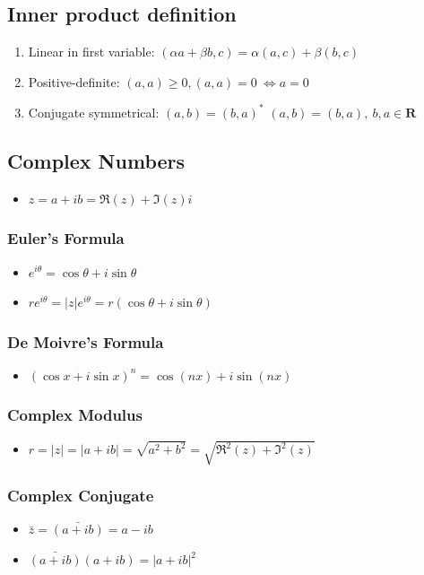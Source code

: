 \documentclass[]{report}
\newcommand \tab[1][1cm]{\hspace*{#1}}
\newcommand{\itemt}{\item \tab}
\begin{document}
\subsection{Inner product definition}     
\begin{enumerate}
\item Linear in first variable:
\subitem \( (\alpha a+\beta b, c) = \alpha(a,c) + \beta(b,c)\)
\item Positive-definite:
\subitem \( (a,a) \geq 0, (a,a) = 0\ \iff a = 0 \)
\item Conjugate symmetrical:
\subitem \( (a,b)=(b,a)^* \)
\subitem \( (a,b)=(b,a),\ b,a \in \mathbf{R} \)					
\end{enumerate}	

\subsection{Complex Numbers}
\begin{itemize}
\itemt \( z = a + ib = \Re(z) + \Im(z)i \)
\end{itemize}

\subsubsection{Euler's Formula}				
\begin{itemize}
\itemt \( e^{i\theta} = \cos{\theta} + i\sin{\theta} \)
\itemt \( re^{i\theta} = |z|e^{i\theta} = r(\cos{\theta} + i\sin{\theta}) \)
\end{itemize}

\subsubsection{De Moivre's Formula}				
\begin{itemize}
\itemt \( (\cos x + i\sin x)^n = \cos(nx) + i\sin(nx) \)
\end{itemize}				

\subsubsection{Complex Modulus}				
\begin{itemize}
\itemt \( r = |z| = |a+ib| = \sqrt{a^2+b^2} = \sqrt{\Re^2(z)+\Im^2(z)} \)
\end{itemize}

\subsubsection{Complex Conjugate}				
\begin{itemize}
\itemt \( \bar{z} = \bar{(a+ib)} = a-ib \)
\itemt \( \bar{(a+ib)}(a+ib) = |a+ib|^2 \)
\end{itemize}
\end{document}
